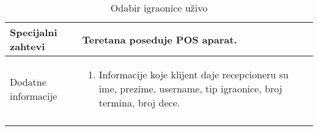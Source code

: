 \documentclass[../../main.tex]{subfiles}
\begin{document}
\begin{longtable}{| p{} | p{} |}
\\
\hline
    Specijalni zahtevi & Teretana poseduje POS aparat. \\
\hline
    Dodatne informacije &
    \begin{enumerate}
     \item Informacije koje klijent daje recepcioneru su ime, prezime, username, tip igraonice, broj termina, broj dece.
    \end{enumerate}\\
\hline
\caption{Odabir igraonice uživo}
\end{longtable}
\end{document}
